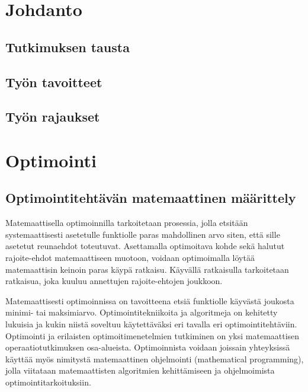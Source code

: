 \documentclass[12pt]{article}
\newenvironment{content}{\pagenumbering{arabic}}{}
\begin{document}
\begin{content}


\section{Johdanto}

\subsection{Tutkimuksen tausta}
\subsection{Työn tavoitteet}
\subsection{Työn rajaukset}

\section{Optimointi}
\subsection{Optimointitehtävän matemaattinen määrittely}

Matemaattisella optimoinnilla tarkoitetaan prosessia, jolla etsitään systemaattisesti asetetulle funktiolle paras mahdollinen arvo siten, että sille asetetut reunaehdot toteutuvat. Asettamalla optimoitava kohde sekä halutut rajoite-ehdot matemaattiseen muotoon, voidaan optimoimalla löytää matemaattisin keinoin paras käypä ratkaisu. Käyvällä ratkaisulla tarkoitetaan ratkaisua, joka kuuluu annettujen rajoite-ehtojen joukkoon. 

Matemaattisesti optimoinnissa on tavoitteena etsiä funktiolle käyvästä joukosta minimi- tai maksimiarvo. Optimointitekniikoita ja algoritmeja on kehitetty lukuisia ja kukin niistä soveltuu käytettäväksi eri tavalla eri optimointitehtäviin. Optimointi ja erilaisten optimoitimenetelmien tutkiminen on yksi matemaattisen operaatiotutkimuksen osa-alueista. Optimoinnista voidaan joissain yhteyksissä käyttää myös nimitystä matemaattinen ohjelmointi (mathematical programming), jolla viitataan matemaattisten algoritmien kehittämiseen ja ohjelmoimista optimointitarkoituksiin.  \parencite[1]{rao}


\end{content}
\end{document}
